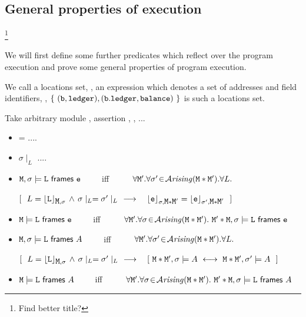 \documentclass[acmsmall,screen]{acmart}
\begin{document}
\subsection{General properties of execution}\footnote{Find better title?}
\label{section:GeneralPropertiesExecution}

We will first define some further predicates which reflect over the program execution and prove
some general properties of program execution.

We call a locations set, , an expression which denotes a set of addresses and field identifiers, \eg, $\{\ (\prg{b},\prg{ledger}), (\prg{b}.\prg{ledger},\prg{balance})\ \}$ is such a locations set.

\begin{definition}[Framing]
Take arbitrary module \M, assertion \A, , ...

\begin{itemize}
\item
{} = ....
\item
$ \sigma\mid _L$ ....
\item
${\mbox{\tt{M}}}, \sigma \models {\mbox{\tt{L}}} ~{\bf{\sf {frames}}}~ {\mbox{\tt{e}}}$\ \ \ \  \ iff \ \ \ \ \
$\forall {\mbox{\tt{M}}}'.\forall \sigma'\!\in\!{\mathcal{A}}\textrm{\textit{rising}}({{\mbox{\tt{M}}}*{\mbox{\tt{M}}}'}). \forall L.$\\
\strut \hspace{1cm} $  [ \ \ L={\lfloor{ {{\mbox{\tt{L}}}}}\rfloor_{{\mbox{\tt{M}}},\sigma}}\, \wedge\,
 \sigma\mid _L= \sigma'\mid_L \ \   \longrightarrow\ \ \   {\lfloor{ {{\mbox{\tt{e}}}}}\rfloor_{\sigma,{\mbox{\tt{M}}}*{\mbox{\tt{M}}}'}}  =  {\lfloor{ {{\mbox{\tt{e}}}}}\rfloor_{\sigma',{\mbox{\tt{M}}}*{\mbox{\tt{M}}}'}}
\ \ ]$
\item
${\mbox{\tt{M}}}  \models {\mbox{\tt{L}}} ~{\bf{\sf {frames}}}~ {\mbox{\tt{e}}}$\ \ \ \  \ iff \ \ \ \ \
$\forall {\mbox{\tt{M}}}'.\forall \sigma\!\in\!{\mathcal{A}}\textrm{\textit{rising}}({{\mbox{\tt{M}}}*{\mbox{\tt{M}}}'}). \ {\mbox{\tt{M}}}'*{\mbox{\tt{M}}}, \sigma \models {\mbox{\tt{L}}} ~{\bf{\sf {frames}}}~ {\mbox{\tt{e}}}$
\item
${\mbox{\tt{M}}}, \sigma \models {\mbox{\tt{L}}} ~{\bf{\sf {frames}}}~A $\ \ \ \  \ iff \ \ \ \ \
$\forall {\mbox{\tt{M}}}'.\forall \sigma'\!\in\!{\mathcal{A}}\textrm{\textit{rising}}({{\mbox{\tt{M}}}*{\mbox{\tt{M}}}'}). \forall L.$\\
\strut \hspace{1cm} $ [ \ \ L=\interp{\prg{L}}{\M,\sigma}\, \wedge\,
\sigma\mid _L= \sigma'\mid_L \ \   \longrightarrow\ \ \   [\ \M*\M',\sigma \models \A   \ \longleftrightarrow\ \M*\M',\sigma' \models \A
\ \ ] $
\item
${\mbox{\tt{M}}}  \models {\mbox{\tt{L}}} ~{\bf{\sf {frames}}}~ A$\ \ \ \  \ iff \ \ \ \ \
$\forall {\mbox{\tt{M}}}'.\forall \sigma\!\in\!{\mathcal{A}}\textrm{\textit{rising}}({{\mbox{\tt{M}}}*{\mbox{\tt{M}}}'}). \ {\mbox{\tt{M}}}'*{\mbox{\tt{M}}}, \sigma \models {\mbox{\tt{L}}} ~{\bf{\sf {frames}}}~ A$
\end{itemize}

\end{definition}
\end{document}

